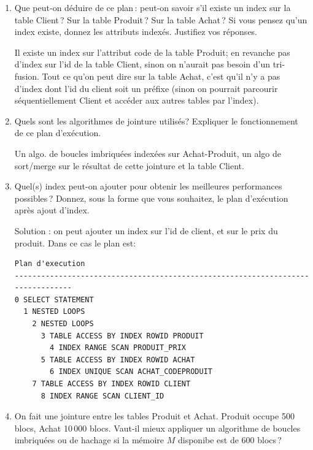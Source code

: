 \begin{enumerate}
 \item Que peut-on déduire de ce plan\,: peut-on savoir s'il
    existe un index sur la table Client\,? 
   Sur la table Produit\,? Sur la table Achat\,? Si vous pensez
   qu'un index existe, donnez les attributs indexés. 
     Justifiez vos réponses.

\begin{solution}
Il existe un index sur l'attribut code de la table Produit;
en revanche pas d'index sur l'id de la table Client, sinon
on n'aurait  pas besoin d'un tri-fusion. Tout ce qu'on peut
dire sur la table Achat, c'est qu'il n'y a pas d'index dont
l'id du client soit un préfixe (sinon on pourrait parcourir séquentiellement
Client et accéder aux autres tables par l'index).
\end{solution}

  \item Quels sont les algorithmes de jointure utilisés? 
      Expliquer le fonctionnement de ce plan d'exécution.

\begin{solution}
Un algo. de boucles imbriquées indexées sur Achat-Produit, un
algo de sort/merge sur le résultat de cette jointure et la
table Client.
\end{solution}

  \item Quel(s) index  peut-on ajouter pour obtenir les meilleures
      performances possibles\,? Donnez, sous la forme 
      que vous souhaitez, le plan d'exécution
        après ajout d'index.

\begin{solution}
Solution : on peut ajouter un index sur l'id de client, et sur le
prix du produit. Dans ce cas le plan est:

\begin{verbatim}
Plan d'execution
--------------------------------------------------------------------------------
0 SELECT STATEMENT
  1 NESTED LOOPS
    2 NESTED LOOPS
      3 TABLE ACCESS BY INDEX ROWID PRODUIT
        4 INDEX RANGE SCAN PRODUIT_PRIX
      5 TABLE ACCESS BY INDEX ROWID ACHAT
        6 INDEX UNIQUE SCAN ACHAT_CODEPRODUIT
    7 TABLE ACCESS BY INDEX ROWID CLIENT
      8 INDEX RANGE SCAN CLIENT_ID
\end{verbatim}
\end{solution}

  \item On fait une jointure entre les tables Produit et Achat.
   Produit occupe 500 blocs, Achat 10\,000 blocs. Vaut-il mieux 
    appliquer un algorithme de boucles imbriquées ou de hachage
    si la mémoire $M$ disponibe est de $600$ blocs\,? 
    

\end{enumerate}
